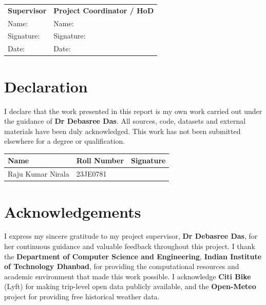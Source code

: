 \documentclass[12pt,a4paper]{report}
\begin{document}
\vspace{1in}
\noindent\begin{tabular}{@{}p{3in}p{3in}@{}}
\textbf{Supervisor} & \textbf{Project Coordinator / HoD} \\[12pt]
Name: \hrulefill & Name: \hrulefill \\[24pt]
Signature: \hrulefill & Signature: \hrulefill \\[24pt]
Date: \hrulefill & Date: \hrulefill \\
\end{tabular}
\clearpage

\chapter*{Declaration}

\noindent I declare that the work presented in this report is my own
work carried out under the guidance of \textbf{Dr Debasree Das}. All
sources, code, datasets and external materials have been duly
acknowledged. This work has not been submitted elsewhere for a degree
or qualification.

\vspace{1in}
\noindent\begin{tabular}{@{}p{2.5in}p{1.5in}p{1.5in}@{}}
\toprule
\textbf{Name} & \textbf{Roll Number} & \textbf{Signature} \\
\midrule
Raju Kumar Nirala & 23JE0781 & \hrulefill \\[18pt]
\bottomrule
\end{tabular}
\clearpage

\chapter*{Acknowledgements}

\noindent I express my sincere gratitude to my project supervisor,
\textbf{Dr Debasree Das}, for her continuous guidance and valuable
feedback throughout this project. I thank the
\textbf{Department of Computer Science and Engineering},
\textbf{Indian Institute of Technology Dhanbad}, for providing the
computational resources and academic environment that made this
work possible. I acknowledge \textbf{Citi Bike} (Lyft) for making
trip-level open data publicly available, and the \textbf{Open-Meteo}
project for providing free historical weather data.
\clearpage
\end{document}
